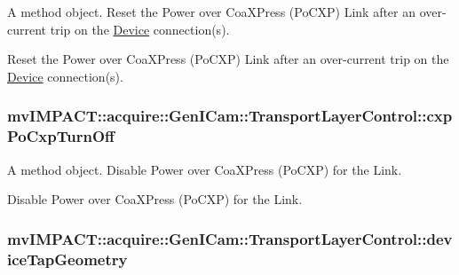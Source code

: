 A method object. Reset the Power over Coa\+X\+Press (Po\+C\+X\+P) Link after an over-\/current trip on the \hyperlink{classmv_i_m_p_a_c_t_1_1acquire_1_1_device}{Device} connection(s). 

Reset the Power over Coa\+X\+Press (Po\+C\+X\+P) Link after an over-\/current trip on the \hyperlink{classmv_i_m_p_a_c_t_1_1acquire_1_1_device}{Device} connection(s). \hypertarget{classmv_i_m_p_a_c_t_1_1acquire_1_1_gen_i_cam_1_1_transport_layer_control_a0d76d661f400c5193f7af6a5c3dbb5fb}{
\subsubsection[{cxp\+Po\+Cxp\+Turn\+Off}]{ mv\+I\+M\+P\+A\+C\+T\+::acquire\+::\+Gen\+I\+Cam\+::\+Transport\+Layer\+Control\+::cxp\+Po\+Cxp\+Turn\+Off}}\label{classmv_i_m_p_a_c_t_1_1acquire_1_1_gen_i_cam_1_1_transport_layer_control_a0d76d661f400c5193f7af6a5c3dbb5fb}


A method object. Disable Power over Coa\+X\+Press (Po\+C\+X\+P) for the Link. 

Disable Power over Coa\+X\+Press (Po\+C\+X\+P) for the Link. \hypertarget{classmv_i_m_p_a_c_t_1_1acquire_1_1_gen_i_cam_1_1_transport_layer_control_ac0d7a3f13520344eb6df37e15e050cac}{
\subsubsection[{device\+Tap\+Geometry}]{ mv\+I\+M\+P\+A\+C\+T\+::acquire\+::\+Gen\+I\+Cam\+::\+Transport\+Layer\+Control\+::device\+Tap\+Geometry}}\label{classmv_i_m_p_a_c_t_1_1acquire_1_1_gen_i_cam_1_1_transport_layer_control_ac0d7a3f13520344eb6df37e15e050cac}


